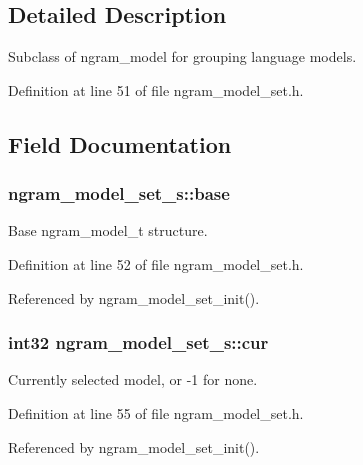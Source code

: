 \subsection{\-Detailed \-Description}
\-Subclass of ngram\-\_\-model for grouping language models. 

\-Definition at line 51 of file ngram\-\_\-model\-\_\-set.\-h.



\subsection{\-Field \-Documentation}
\subsubsection[{base}]{ {\bf ngram\-\_\-model\-\_\-set\-\_\-s\-::base}}\label{structngram__model__set__s_a3b88f17aa148ceac4f32dd4cbf5f4f81}


\-Base ngram\-\_\-model\-\_\-t structure. 



\-Definition at line 52 of file ngram\-\_\-model\-\_\-set.\-h.



\-Referenced by ngram\-\_\-model\-\_\-set\-\_\-init().

\subsubsection[{cur}]{\setlength{\rightskip}{0pt plus 5cm}int32 {\bf ngram\-\_\-model\-\_\-set\-\_\-s\-::cur}}\label{structngram__model__set__s_a031e7d7dcf1667f69e1cb980f45623cb}


\-Currently selected model, or -\/1 for none. 



\-Definition at line 55 of file ngram\-\_\-model\-\_\-set.\-h.



\-Referenced by ngram\-\_\-model\-\_\-set\-\_\-init().

